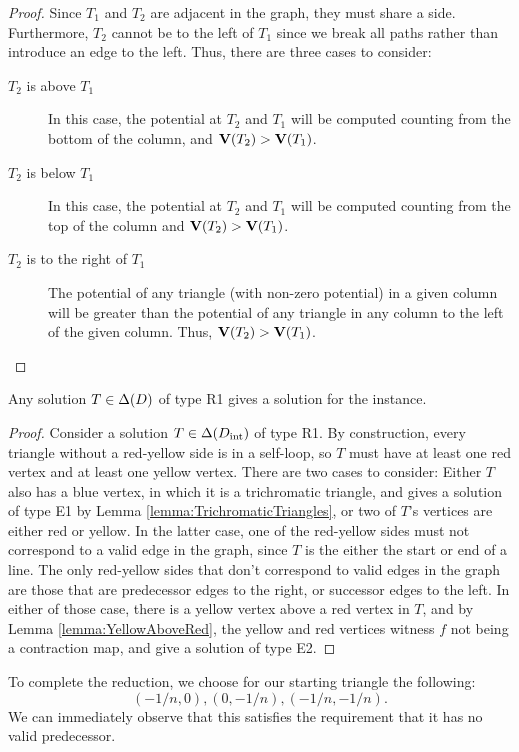   \begin{proof}
    Since $T_1$ and $T_2$ are adjacent in the \EOPL graph, they must share a side. Furthermore, $T_2$ cannot be to the left of $T_1$ since we break all paths rather than introduce an edge to the left. Thus, there are three cases to consider:
    \begin{description}
    \item[$T_2$ is above $T_1$] In this case, the potential at $T_2$ and $T_1$ will be computed counting from the bottom of the column, and $\mathbf{V}(T_2) > \mathbf{V}(T_1)$.
    \item[$T_2$ is below $T_1$] In this case, the potential at $T_2$ and $T_1$ will be computed counting from the top of the column and $\mathbf{V}(T_2) > \mathbf{V}(T_1)$. 
    \item[$T_2$ is to the right of $T_1$] The potential of any triangle (with non-zero potential) in a given column will be greater than the potential of any triangle in any column to the left of the given column. Thus, $\mathbf{V}(T_2) > \mathbf{V}(T_1)$.
    \end{description}
  \end{proof}

  \begin{lemma} \label{EndOfLineSolutions}
    Any solution $T \in \Delta(D)$ of type R1 gives a solution for the \TwoDContractionMap instance.
  \end{lemma}
  \begin{proof}
     Consider a solution $T \in \Delta(D_{\mathrm{int}})$ of type R1. By construction, every triangle without a red-yellow side is in a self-loop, so $T$ must have at least one red vertex and at least one yellow vertex. There are two cases to consider: Either $T$ also has a blue vertex, in which it is a trichromatic triangle, and gives a solution of type E1 by Lemma \ref{lemma:TrichromaticTriangles}, or two of $T$'s vertices are either red or yellow. In the latter case, one of the red-yellow sides must not correspond to a valid edge in the graph, since $T$ is the either the start or end of a line. The only red-yellow sides that don't correspond to valid edges in the graph are those that are predecessor edges to the right, or successor edges to the left. In either of those case, there is a yellow vertex above a red vertex in $T$, and by Lemma \ref{lemma:YellowAboveRed}, the yellow and red vertices witness $f$ not being a contraction map, and give a solution of type E2.
    \end{proof}
    
    To complete the reduction, we choose for our starting triangle the following: \[(-1/n,0),(0,-1/n),(-1/n,-1/n).\] We can immediately observe that this satisfies the requirement that it has no valid predecessor.

